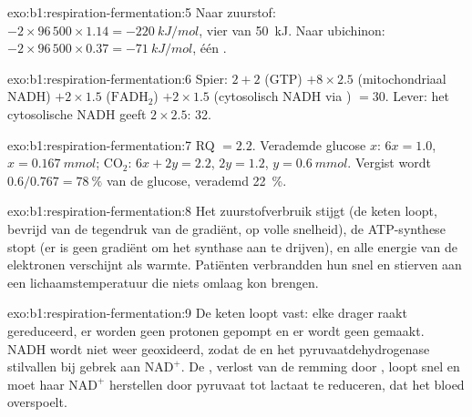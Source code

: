 \begin{solution}{exo:b1:respiration-fermentation:5}
Naar zuurstof: $-2\times 96\,500\times 1.14 = \qty{-220}{kJ/mol}$, vier  van
\qty{50}{kJ}. Naar ubichinon: $-2\times 96\,500\times 0.37 =
\qty{-71}{kJ/mol}$, één .
\end{solution}

\begin{solution}{exo:b1:respiration-fermentation:6}
Spier: $2 + 2$ (GTP) $+ 8\times 2.5$ (mitochondriaal NADH) $+ 2\times
1.5$ ($\mathrm{FADH_2}$) $+ 2\times 1.5$ (cytosolisch NADH via ) $=
30$. Lever: het cytosolische NADH geeft $2\times 2.5$: 32.
\end{solution}

\begin{solution}{exo:b1:respiration-fermentation:7}
RQ $= 2.2$. Verademde glucose $x$: $6x = 1.0$, $x = \qty{0.167}{mmol}$;
$\mathrm{CO_2}$: $6x + 2y = 2.2$, $2y = 1.2$, $y = \qty{0.6}{mmol}$. Vergist wordt
$0.6/0.767 = \qty{78}{\%}$ van de glucose, verademd \qty{22}{\%}.
\end{solution}

\begin{solution}{exo:b1:respiration-fermentation:8}
Het zuurstofverbruik stijgt (de keten loopt, bevrijd van de tegendruk van de
gradiënt, op volle snelheid), de ATP-synthese stopt (er is geen gradiënt om het
synthase aan te drijven), en alle energie van de elektronen verschijnt als warmte.
Patiënten verbrandden hun  snel en stierven aan een lichaamstemperatuur die
niets omlaag kon brengen.
\end{solution}

\begin{solution}{exo:b1:respiration-fermentation:9}
De keten loopt vast: elke drager raakt gereduceerd, er worden geen protonen gepompt
en er wordt geen  gemaakt. NADH wordt niet weer geoxideerd, zodat de 
en het pyruvaatdehydrogenase stilvallen bij gebrek aan $\mathrm{NAD^+}$. De
, verlost van de remming door , loopt snel en moet haar
$\mathrm{NAD^+}$ herstellen door pyruvaat tot lactaat te reduceren, dat het bloed
overspoelt.
\end{solution}

